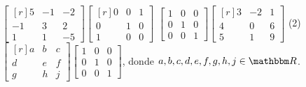 \begin{tasks}[
    start=19,
    style=enumerate,
    label-offset = 2.9mm,
    ]
    \task $\begin{bmatrix*}[r]5 & -1 & -2 \\ -1 & 3 & 2 \\ 1 & 1 & -5\end{bmatrix*}\begin{bmatrix*}[r]0 & 0 & 1 \\ 0 & 1 & 0 \\ 1 & 0 & 0\end{bmatrix*}$
    \task $\begin{bmatrix*}1 & 0 & 0 \\ 0 & 1 & 0 \\ 0 & 0 & 1\end{bmatrix*}\begin{bmatrix*}[r]3 & -2 & 1 \\ 4 & 0 & 6 \\ 5 & 1 & 9\end{bmatrix*}$
    \task*(2) $\begin{bmatrix*}[r]a & b & c \\ d & e & f \\ g & h & j\end{bmatrix*}\begin{bmatrix*}1 & 0 & 0 \\ 0 & 1 & 0 \\ 0 & 0 & 1\end{bmatrix*}$, donde $a, b, c, d, e, f, g, h, j \in \RR$.
\end{tasks}
